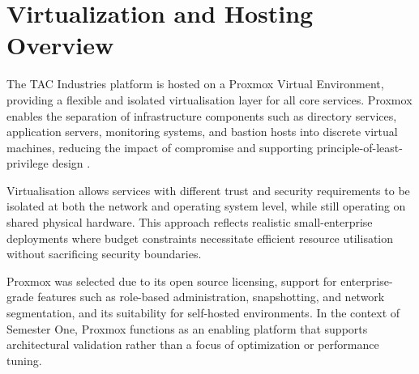 \section{Virtualization and Hosting Overview}

The TAC Industries platform is hosted on a Proxmox Virtual Environment, providing a flexible and isolated virtualisation layer for all core services. Proxmox enables the separation of infrastructure components such as directory services, application servers, monitoring systems, and bastion hosts into discrete virtual machines, reducing the impact of compromise and supporting principle-of-least-privilege design \cite{proxmox}.

Virtualisation allows services with different trust and security requirements to be isolated at both the network and operating system level, while still operating on shared physical hardware. This approach reflects realistic small-enterprise deployments where budget constraints necessitate efficient resource utilisation without sacrificing security boundaries.

Proxmox was selected due to its open source licensing, support for enterprise-grade features such as role-based administration, snapshotting, and network segmentation, and its suitability for self-hosted environments. In the context of Semester One, Proxmox functions as an enabling platform that supports architectural validation rather than a focus of optimization or performance tuning.
